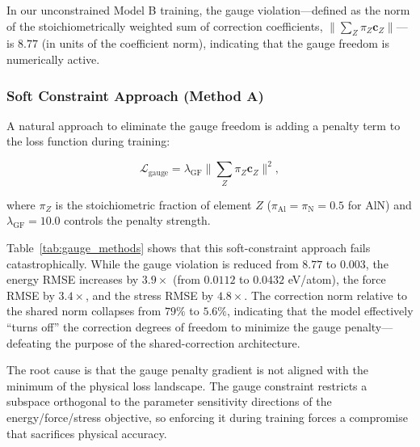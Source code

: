 \documentclass[twoside,prb,aps,floatfix,superscriptaddress,longbibliography]{revtex4-2}
\begin{document}
In our unconstrained Model B training, the gauge violation---defined as the norm of the stoichiometrically weighted sum of correction coefficients, $\lVert \sum_Z \pi_Z \mathbf{c}_Z \rVert$---is $8.77$ (in units of the coefficient norm), indicating that the gauge freedom is numerically active.

\subsubsection{Soft Constraint Approach (Method A)}

A natural approach to eliminate the gauge freedom is adding a penalty term to the loss function during training:

\begin{equation}
\mathcal{L}_{\mathrm{gauge}} = \lambda_{\mathrm{GF}} \Big\lVert \sum_Z \pi_Z \mathbf{c}_Z \Big\rVert^2,
\label{eq:soft_gauge}
\end{equation}

where $\pi_Z$ is the stoichiometric fraction of element $Z$ ($\pi_{\mathrm{Al}} = \pi_{\mathrm{N}} = 0.5$ for AlN) and $\lambda_{\mathrm{GF}} = 10.0$ controls the penalty strength.

Table~\ref{tab:gauge_methods} shows that this soft-constraint approach fails catastrophically. While the gauge violation is reduced from $8.77$ to $0.003$, the energy RMSE increases by $3.9\times$ (from $0.0112$ to $0.0432$ eV/atom), the force RMSE by $3.4\times$, and the stress RMSE by $4.8\times$. The correction norm relative to the shared norm collapses from $79\%$ to $5.6\%$, indicating that the model effectively ``turns off'' the correction degrees of freedom to minimize the gauge penalty---defeating the purpose of the shared-correction architecture.

The root cause is that the gauge penalty gradient is not aligned with the minimum of the physical loss landscape. The gauge constraint restricts a subspace orthogonal to the parameter sensitivity directions of the energy/force/stress objective, so enforcing it during training forces a compromise that sacrifices physical accuracy.
\end{document}
